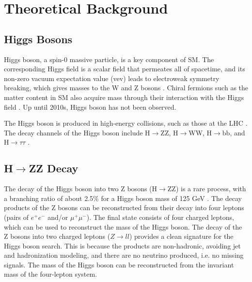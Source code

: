 \section{Theoretical Background}
\subsection{Higgs Bosons}
Higgs boson, a spin-0 massive particle, is a key component of SM. The corresponding Higgs field is a scalar field that permeates all of spacetime, and its non-zero vacuum expectation value (vev) leads to electroweak symmetry breaking, which gives masses to the W and Z bosons \cite{PeskinSchroeder1995, Weinberg1995}. Chiral fermions such as the matter content in SM also acquire mass through their interaction with the Higgs field \cite{PeskinSchroeder1995, Weinberg1995}. Up until 2010s, Higgs boson has not been observed. 

The Higgs boson is produced in high-energy collisions, such as those at the LHC \cite{CMS:2012qbp}. The decay channels of the Higgs boson include H$\rightarrow$ZZ, H$\rightarrow$WW, H$\rightarrow$bb, and H$\rightarrow$$\tau\tau$ \cite{Gunion:1990,PDG2023Higgs}. 

\subsection{H$\rightarrow$ZZ Decay}
The decay of the Higgs boson into two Z bosons (H$\rightarrow$ZZ) is a rare process, with a branching ratio of about 2.5\% for a Higgs boson mass of 125 GeV \cite{PDG2023Higgs}. The decay products of the Z bosons can be reconstructed from their decay into four leptons (pairs of $e^+e^-$ and/or $\mu^+\mu^-$). The final state consists of four charged leptons, which can be used to reconstruct the mass of the Higgs boson. The decay of the Z bosons into two charged leptons ($Z\rightarrow ll$) provides a clean signature for the Higgs boson search. This is because the products are non-hadronic, avoiding jet and hadronization modeling, and there are no neutrino produced, i.e. no missing signals. The mass of the Higgs boson can be reconstructed from the invariant mass of the four-lepton system. 

